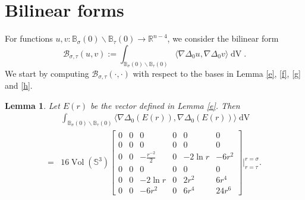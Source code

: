 \documentclass[11pt,letterpaper]{amsart}
\DeclareMathOperator{\Vol}{Vol}
\DeclareMathOperator{\dvol}{dV}
\newcommand{\mB}{\mathcal{B}}
\newcommand{\bB}{\mathbb{B}}
\newcommand{\bR}{\mathbb{R}}
\newcommand{\bS}{\mathbb{S}}
\newtheorem{lemma}[theorem]{Lemma}
\theoremstyle{definition}
\theoremstyle{remark}
\numberwithin{equation}{section}
\begin{document}
\section{Bilinear forms}\label{bilinear}
For functions $u,v:\bB_{\sigma}(0)\backslash \bB_{\tau}(0)\to \bR^{n-4}$, we consider the bilinear form
\begin{equation*}
    \mB_{\sigma, \tau}(u,v):=\int_{\bB_{\sigma}(0)\backslash \bB_{\tau}(0)} \langle \nabla \Delta_0 u, \nabla \Delta_0 v\rangle \dvol.
\end{equation*}
We start by computing $\mB_{\sigma, \tau}(\cdot,\cdot)$ with respect to the bases in Lemma \ref{e}, \ref{f}, \ref{g} and \ref{h}.
\begin{lemma}\label{energy-e}
Let $E(r)$ be the vector defined in Lemma \ref{e}. Then
    \begin{equation}
\begin{split}
    &\int_{\bB_{\sigma}(0)\backslash \bB_{\tau}(0)}\langle \nabla \Delta_0 (E(r)), \nabla \Delta_0(E(r))\rangle \dvol\\
=&16\Vol(\bS^3)\begin{bmatrix}
0 & 0 & 0 & 0 & 0& 0\\
0 & 0 & 0 & 0 & 0& 0\\
0 & 0 & -\frac{r^{-2}}{2} & 0 & -2\ln r& -6r^2\\
0 & 0 & 0 & 0 & 0& 0\\
0 & 0 & -2\ln r & 0 & 2r^2 & 6r^4\\
0 & 0 & -6r^{2} & 0 & 6r^4 & 24r^6
\end{bmatrix}\Bigg|^{r=\sigma}_{r=\tau}.
    \end{split}
\end{equation}
\end{lemma}
\end{document}

